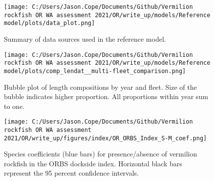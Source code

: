 \documentclass[11pt,
  english,
  a4paper,
]{article}
\begin{document}
\tagmcend\tagstructend


\begin{figure}
\centering
\texttt{[image: C:/Users/Jason.Cope/Documents/Github/Vermilion rockfish OR WA assessment 2021/OR/write\_up/models/Reference model/plots/data\_plot.png]}
\caption{Summary of data sources used in the reference model.\label{fig:data-plot}}
\end{figure}

\tagmcend\tagstructend


\begin{figure}
\centering
\texttt{[image: C:/Users/Jason.Cope/Documents/Github/Vermilion rockfish OR WA assessment 2021/OR/write\_up/models/Reference model/plots/comp\_lendat\_\_multi-fleet\_comparison.png]}
\caption{Bubble plot of length compositions by year and fleet. Size of the bubble indicates higher proportion. All proportions within year sum to one.\label{fig:comm-rec-lts_bubbs}}
\end{figure}

\tagmcend\tagstructend


\begin{figure}
\centering
\texttt{[image: C:/Users/Jason.Cope/Documents/Github/Vermilion rockfish OR WA assessment 2021/OR/write\_up/figures/index/OR\_ORBS\_Index\_S-M\_coef.png]}
\caption{Species coefficients (blue bars) for presence/absence of vermilion rockfish in the ORBS dockside index. Horizontal black bars represent the 95 percent confidence intervals.\label{fig:s-m-coef}}
\end{figure}

\tagmcend\tagstructend

\end{document}
